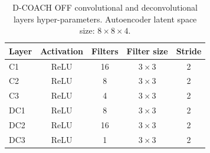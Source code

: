 \begin{table}[H]
\parbox{\linewidth}{
\centering
\caption[D-COACH OFF convolutional and deconvolutional layers hyper-parameters.]{D-COACH OFF convolutional and deconvolutional layers hyper-parameters. Autoencoder latent space size: $8\times8\times4$.}
\label{table:off_hypers1}
\begin{tabular}{lcccc}
\textbf{Layer} & \multicolumn{1}{l}{\textbf{Activation}} & \multicolumn{1}{l}{\textbf{Filters}} & \multicolumn{1}{l}{\textbf{Filter size}} & \multicolumn{1}{l}{\textbf{Stride}} \\ \hline \hline
C1             & ReLU                                    & 16                                   & $3\times3$                                    & 2                                   \\ \hline
C2             & ReLU                                    & 8                                    & $3\times3$                                    & 2                                   \\ \hline
C3             & ReLU                                    & 4                                    & $3\times3$                                    & 2                                   \\ \hline
DC1            & ReLU                                    & 8                                    & $3\times3$                                    & 2                                   \\ \hline
DC2            & ReLU                                    & 16                                   & $3\times3$                                    & 2                                   \\ \hline
DC3            & ReLU                                    & 1                                    & $3\times3$                                    & 2                                   \\ \hline
\end{tabular}}
\end{table}

